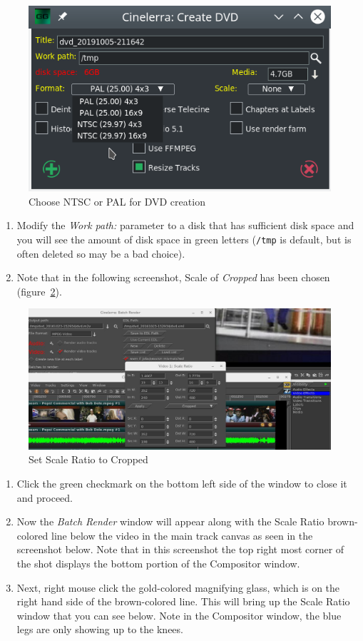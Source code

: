\begin{figure}[htpb]
    \centering
    \includegraphics[width=0.7\linewidth]{images/dvd01.png}
    \caption{Choose NTSC or PAL for DVD creation}
    \label{fig:dvd-000}
\end{figure}

\begin{enumerate}[start=6]
    \item Modify the \textit{Work path:} parameter to a disk that has sufficient disk space and you will see the
    amount of disk space in green letters (\texttt{/tmp} is default, but is often deleted so may be a bad choice).
    \item Note that in the following screenshot, Scale of \textit{Cropped} has been chosen (figure~\ref{fig:dvd03}).    
\end{enumerate}

\begin{figure}[htpb]
    \centering
    \includegraphics[width=0.9\linewidth]{images/dvd03.png}
    \caption{Set Scale Ratio to Cropped}
    \label{fig:dvd03}
\end{figure}

\begin{enumerate}[start=8]
    \item Click the green checkmark on the bottom left side of the window to close it and proceed.
    \item Now the \textit{Batch Render} window will appear along with the Scale Ratio brown-colored line below the video in the main track canvas as seen in the screenshot below. Note that in this screenshot the top right most corner of the shot displays the bottom portion of the Compositor window.
    \item Next, right mouse click the gold-colored magnifying glass, which is on the right hand side of the brown-colored line. This will bring up the Scale Ratio window that you can see below.  Note in the Compositor window, the blue legs are only showing up to the knees.
\end{enumerate}

